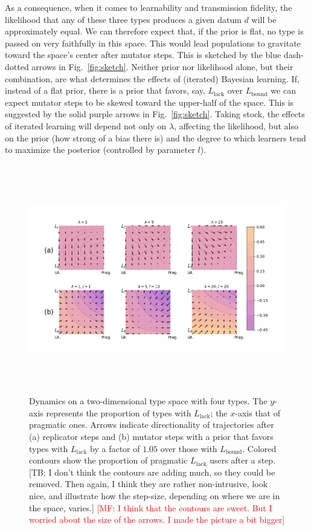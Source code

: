 \documentclass[a4paper, 11pt]{article}
\theoremstyle{Satz}
\newcommand{\mf}[1]{\textcolor{Red}{[MF: #1]}}
\newcommand{\tb}[1]{\textcolor[rgb]{.8,.33,.0}{[TB: #1]}}%
\newcommand{\mylang}[1]{\ensuremath{L_{\text{#1}}}\xspace} %
\newcommand{\Lbound}{\mylang{bound}}
\newcommand{\Llack}{\mylang{lack}}
\begin{document}
As a consequence, when it comes to learnability and transmission fidelity, the likelihood that
any of these three types produces a given datum $d$ will be approximately equal. We can
therefore expect that, if the prior is flat, no type is passed on very faithfully in this
space. This would lead populations to gravitate toward the space's center after mutator
steps. This is sketched by the blue dash-dotted arrows in Fig.~\ref{fig:sketch}. Neither prior
nor likelihood alone, but their combination, are what determines the effects of (iterated)
Bayesian learning. If, instead of a flat prior, there is a prior that favors, say, $\Llack$
over $\Lbound$ we can expect mutator steps to be skewed toward the upper-half of the
space. This is suggested by the solid purple arrows in Fig.~\ref{fig:sketch}. Taking stock, the
effects of iterated learning will depend not only on $\lambda$, affecting the likelihood, but
also on the prior (how strong of a bias there is) and the degree to which learners tend to
maximize the posterior (controlled by parameter $l$).

\begin{figure}[t]
\centering
\includegraphics[width=1.08\textwidth,height=10cm, keepaspectratio]{./plots/fig-contourb105k5.png}
\caption{Dynamics on a two-dimensional type space with four types. The $y$-axis represents the
  proportion of types with $\Llack$; the $x$-axis that of pragmatic ones. Arrows indicate
  directionality of trajectories after (a) replicator steps and (b) mutator steps with a prior
  that favors types with $\Llack$ by a factor of $1.05$ over those with $\Lbound$. Colored
  contours show the proportion of pragmatic $\Llack$ users after a step. \tb{I don't think the
    contours are adding much, so they could be removed. Then again, I think they are rather
    non-intrusive, look nice, and illustrate how the step-size, depending on where we are in
    the space, varies.} \mf{I think that the contours are sweet. But I worried about the size
  of the arrows. I made the picture a bit bigger}}

\label{fig:quiver}
\end{figure}
\end{document}
